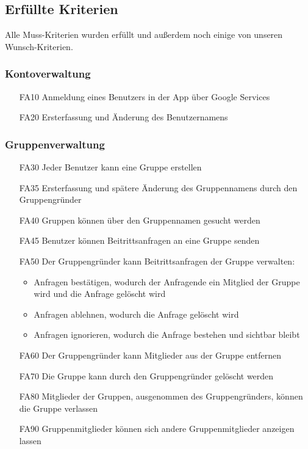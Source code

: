 \documentclass{scrartcl}
\begin{document}
	
	\subsection{Erfüllte Kriterien}
		Alle Muss-Kriterien wurden erfüllt und außerdem noch einige von unseren Wunsch-Kriterien.
		
	\subsubsection{Kontoverwaltung}
	\begin{itemize}
		\item[FA10] Anmeldung eines Benutzers in der App über Google Services
		\item[FA20] Ersterfassung und Änderung des Benutzernamens
	\end{itemize}
	
	\subsubsection{Gruppenverwaltung}
	\begin{itemize}
		\item[FA30] Jeder Benutzer kann eine Gruppe erstellen
		\item[FA35] Ersterfassung und spätere Änderung des Gruppennamens durch den Gruppengründer
		\item[FA40] Gruppen können über den Gruppennamen gesucht werden
		\item[FA45] Benutzer können Beitrittsanfragen an eine Gruppe senden
		\item[FA50] Der Gruppengründer kann Beitrittsanfragen der Gruppe verwalten:
		\begin{itemize}
			\item Anfragen bestätigen, wodurch der Anfragende ein Mitglied der Gruppe wird und die Anfrage gelöscht wird
			\item Anfragen ablehnen, wodurch die Anfrage gelöscht wird
			\item Anfragen ignorieren, wodurch die Anfrage bestehen und sichtbar bleibt
		\end{itemize}
		\item[FA60] Der Gruppengründer kann Mitglieder aus der Gruppe entfernen
		\item[FA70] Die Gruppe kann durch den Gruppengründer gelöscht werden
		\item[FA80] Mitglieder der Gruppen, ausgenommen des Gruppengründers, können die Gruppe verlassen
		\item[FA90] Gruppenmitglieder können sich andere Gruppenmitglieder anzeigen lassen
	\end{itemize}
	
\end{document}
